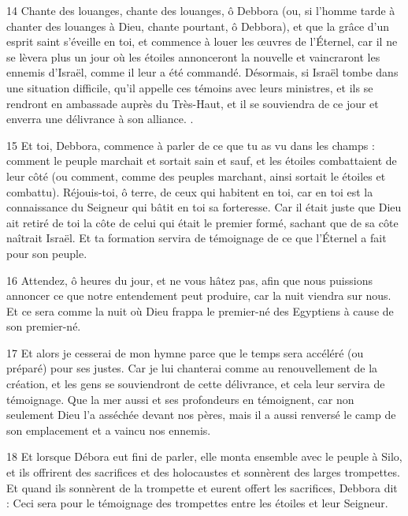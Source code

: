 \par 14 Chante des louanges, chante des louanges, ô Debbora (ou, si l'homme tarde à chanter des louanges à Dieu, chante pourtant, ô Debbora), et que la grâce d'un esprit saint s'éveille en toi, et commence à louer les œuvres de l'Éternel, car il ne se lèvera plus un jour où les étoiles annonceront la nouvelle et vaincraront les ennemis d'Israël, comme il leur a été commandé. Désormais, si Israël tombe dans une situation difficile, qu'il appelle ces témoins avec leurs ministres, et ils se rendront en ambassade auprès du Très-Haut, et il se souviendra de ce jour et enverra une délivrance à son alliance. .

\par 15 Et toi, Debbora, commence à parler de ce que tu as vu dans les champs : comment le peuple marchait et sortait sain et sauf, et les étoiles combattaient de leur côté (ou comment, comme des peuples marchant, ainsi sortait le étoiles et combattu). Réjouis-toi, ô terre, de ceux qui habitent en toi, car en toi est la connaissance du Seigneur qui bâtit en toi sa forteresse. Car il était juste que Dieu ait retiré de toi la côte de celui qui était le premier formé, sachant que de sa côte naîtrait Israël. Et ta formation servira de témoignage de ce que l'Éternel a fait pour son peuple.

\par 16 Attendez, ô heures du jour, et ne vous hâtez pas, afin que nous puissions annoncer ce que notre entendement peut produire, car la nuit viendra sur nous. Et ce sera comme la nuit où Dieu frappa le premier-né des Egyptiens à cause de son premier-né.

\par 17 Et alors je cesserai de mon hymne parce que le temps sera accéléré (ou préparé) pour ses justes. Car je lui chanterai comme au renouvellement de la création, et les gens se souviendront de cette délivrance, et cela leur servira de témoignage. Que la mer aussi et ses profondeurs en témoignent, car non seulement Dieu l'a asséchée devant nos pères, mais il a aussi renversé le camp de son emplacement et a vaincu nos ennemis.

\par 18 Et lorsque Débora eut fini de parler, elle monta ensemble avec le peuple à Silo, et ils offrirent des sacrifices et des holocaustes et sonnèrent des larges trompettes. Et quand ils sonnèrent de la trompette et eurent offert les sacrifices, Debbora dit : Ceci sera pour le témoignage des trompettes entre les étoiles et leur Seigneur.

